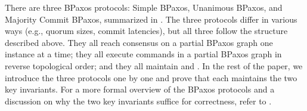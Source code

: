 There are three BPaxos protocols: Simple BPaxos, Unanimous BPaxos, and Majority
Commit BPaxos, summarized in . The three protocols differ
in various ways (e.g., quorum sizes, commit latencies), but all three follow
the structure described above. They all reach consensus on a partial BPaxos
graph one instance at a time; they all execute commands in a partial BPaxos
graph in reverse topological order; and they all maintain
 and . In the rest of the
paper, we introduce the three protocols one by one and prove that each
maintains the two key invariants. For a more formal overview of the BPaxos
protocols and a discussion on why the two key invariants suffice for
correctness, refer to .


